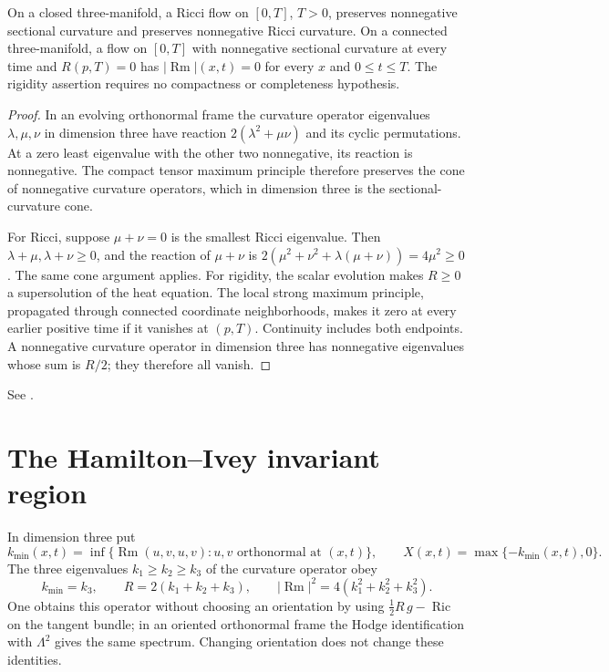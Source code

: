 \begin{proposition}\label{prop:rf-positivity}
On a closed three-manifold, a Ricci flow on $[0,T]$, $T>0$, preserves
nonnegative sectional curvature and preserves nonnegative Ricci curvature.
On a connected three-manifold, a flow on $[0,T]$ with nonnegative
sectional curvature at every time and $R(p,T)=0$ has
$|\operatorname{Rm}|(x,t)=0$ for every $x$ and $0\leq t\leq T$.
The rigidity assertion requires no compactness or completeness hypothesis.
\end{proposition}
\begin{proof}
In an evolving orthonormal frame the curvature operator eigenvalues
$\lambda,\mu,\nu$ in dimension three have reaction
$2(\lambda^2+\mu\nu)$ and its cyclic permutations.
At a zero least eigenvalue with the other two nonnegative, its reaction
is nonnegative.  The compact tensor maximum principle therefore
preserves the cone of nonnegative curvature operators, which in
dimension three is the sectional-curvature cone.

For Ricci, suppose $\mu+\nu=0$ is the smallest Ricci eigenvalue.
Then $\lambda+\mu,\lambda+\nu\geq0$, and the reaction of $\mu+\nu$ is
$2(\mu^2+\nu^2+\lambda(\mu+\nu))=4\mu^2\geq0$.
The same cone argument applies.  For rigidity, the scalar evolution
makes $R\geq0$ a supersolution of the heat equation.  The local strong
maximum principle, propagated through connected coordinate
neighborhoods, makes it zero at every earlier positive time if it
vanishes at $(p,T)$.  Continuity includes both endpoints.  A
nonnegative curvature operator in dimension three has nonnegative
eigenvalues whose sum is $R/2$; they therefore all vanish.
\end{proof}
See \cite[Proposition 4.1, pp.~64--65; Corollaries 4.14--4.15,
pp.~69--70; Theorem 4.18, pp.~71--72]{MT2007}.

\section{The Hamilton--Ivey invariant region}
\label{sec:rf-pinching}

In dimension three put
\[
 k_{\min}(x,t)=\inf\{\operatorname{Rm}(u,v,u,v):
                   u,v\text{ orthonormal at }(x,t)\},\qquad
 X(x,t)=\max\{-k_{\min}(x,t),0\}.
\]
The three eigenvalues $k_1\geq k_2\geq k_3$ of the curvature operator obey
\begin{equation}\label{eq:rf-spectrum}
 k_{\min}=k_3,\qquad R=2(k_1+k_2+k_3),\qquad
 |\operatorname{Rm}|^2=4(k_1^2+k_2^2+k_3^2).
\end{equation}
One obtains this operator without choosing an orientation by using
$\tfrac12R\,g-\operatorname{Ric}$ on the tangent bundle; in an oriented
orthonormal frame the Hodge identification with $\Lambda^2$ gives the
same spectrum.  Changing orientation does not change these identities.

